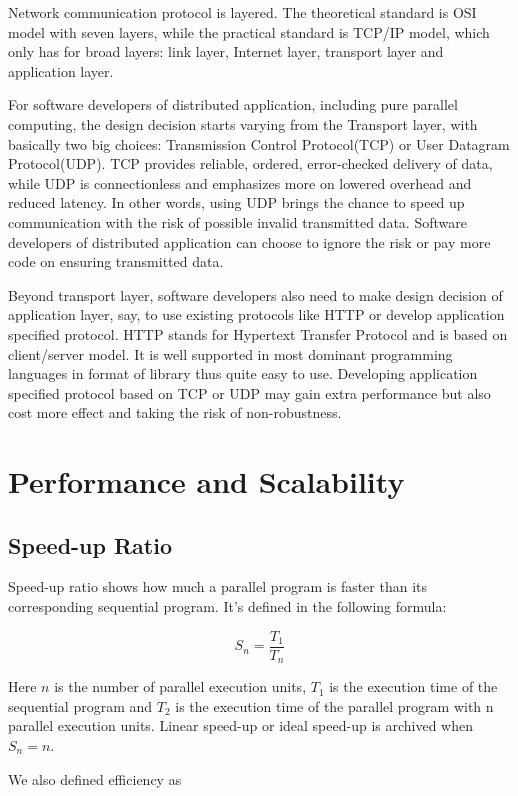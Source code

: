 \documentclass[12pt,a4paper]{report}
\begin{document}
Network communication protocol is layered. The theoretical standard is OSI model with seven layers, while the practical standard is TCP/IP model, which only has for broad layers: link layer, Internet layer, transport layer and application layer.

For software developers of distributed application, including pure parallel computing, the design decision starts varying from the Transport layer, with basically two big choices: Transmission Control Protocol(TCP) or User Datagram Protocol(UDP). TCP provides reliable, ordered, error-checked delivery of data, while UDP is connectionless and emphasizes more on lowered overhead and reduced latency. In other words, using UDP brings the chance to speed up communication with the risk of possible invalid transmitted data. Software developers of distributed application can choose to ignore the risk or pay more code on ensuring transmitted data.

Beyond transport layer, software developers also need to make design decision of application layer, say, to use existing protocols like HTTP or develop application specified protocol. HTTP stands for Hypertext Transfer Protocol and is based on client/server model. It is well supported in most dominant programming languages in format of library thus quite easy to use. Developing application specified protocol based on TCP or UDP may gain extra performance but also cost more effect and taking the risk of non-robustness.

\section{Performance and Scalability}

\subsection{Speed-up Ratio}

Speed-up ratio shows how much a parallel program is faster than its corresponding sequential program. It's defined in the following formula:

$$ S_n = \frac{T_1}{T_n} $$

Here $n$ is the number of parallel execution units, $T_1$ is the execution time of the sequential program and $T_2$ is the execution time of the parallel program with n parallel execution units. Linear speed-up or ideal speed-up is archived when $S_n = n$. 

We also defined efficiency as
\end{document}
